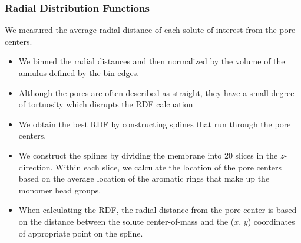 \documentclass{article}
\begin{document}

  \subsubsection*{Radial Distribution Functions}

  We measured the average radial distance of each solute of interest from the pore
  centers.
  \begin{itemize}
	\item We binned the radial distances and then normalized by the volume
	of the annulus defined by the bin edges.
	\item Although the pores are often described as straight, they have a
	small degree of tortuosity which disrupts the RDF calcuation 
	\item We obtain the best RDF by constructing splines that run through the
	pore centers.
	\item We construct the splines by dividing the membrane into 20 slices
	in the $z$-direction. Within each slice, we calculate the location of 
	the pore centers based on the average location of the aromatic rings
	that make up the monomer head groups.
	\item When calculating the RDF, the radial distance from the pore center
	is based on the distance between the solute center-of-mass and the ($x$, $y$)
	coordinates of appropriate point on the spline.
  \end{itemize}
\end{document}

